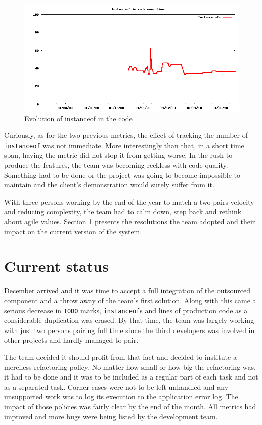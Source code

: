 \documentclass[lnbip]{svmultln}
\begin{document}
\begin{figure}[hbt]
  \centerline{
    \includegraphics[width=120mm]{InstanceOfs.png}
  }
  \caption{Evolution of instanceof in the code }
  \label{fig:InstanceOfs}
\end{figure}

Curiously, as for the two previous metrics, the effect of tracking the
number of \texttt{instanceof} was not immediate. More interestingly
than that, in a short time span, having the metric did not stop it
from getting worse. In the rush to produce the features, the team was
becoming reckless with code quality.  Something had to be done or the
project was going to become impossible to maintain and the client's
demonstration would surely suffer from it.

With three persons working by the end of the year to match a two pairs
velocity and reducing complexity, the team had to calm down, step back
and rethink about agile values. Section \ref{sec:nowadays} presents
the resolutions the team adopted and their impact on the current
version of the system.

\section{Current status}
\label{sec:nowadays}

December arrived and it was time to accept a full integration of the
outsourced component and a throw away of the team's first
solution. Along with this came a serious decrease in \texttt{TODO}
marks, \texttt{instanceof}s and lines of production code as a
considerable duplication was erased. By that time, the team was
largely working with just two persons pairing full time since the
third developers was involved in other projects and hardly managed to
pair.

The team decided it should profit from that fact and decided to
institute a merciless refactoring policy. No matter how small or how
big the refactoring was, it had to be done and it was to be included
as a regular part of each task and not as a separated task. Corner
cases were not to be left unhandled and any unsupported work was to
log its execution to the application error log. The impact of those
policies was fairly clear by the end of the month. All metrics had
improved and more bugs were being listed by the development team.
\end{document}
